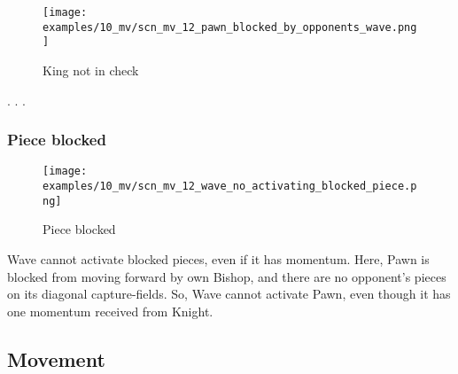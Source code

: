 
\vspace*{-0.7\baselineskip}
\noindent
\begin{wrapfigure}[15]{l}{0.4\textwidth}
\centering
\texttt{[image: examples/10\_mv/scn\_mv\_12\_pawn\_blocked\_by\_opponents\_wave.png]}
\vspace*{-1.4\baselineskip}
\caption{King not in check}
\label{fig:scn_mv_12_pawn_blocked_by_opponents_wave}
\end{wrapfigure}
. . .

\clearpage %

\subsubsection*{Piece blocked}
\label{sec:Miranda's veil/Wave/Activation/Piece blocked}

\vspace*{-1.4\baselineskip}
\noindent
\begin{figure}[h]
\texttt{[image: examples/10\_mv/scn\_mv\_12\_wave\_no\_activating\_blocked\_piece.png]}
\caption{Piece blocked}
\label{fig:scn_mv_12_wave_no_activating_blocked_piece}
\end{figure}

Wave cannot activate blocked pieces, even if it has momentum. Here, Pawn is blocked
from moving forward by own Bishop, and there are no opponent's pieces on its
diagonal capture-fields. So, Wave cannot activate Pawn, even though it has one
momentum received from Knight.

\clearpage %

\subsection*{Movement}
\label{sec:Miranda's veil/Wave/Movement}

